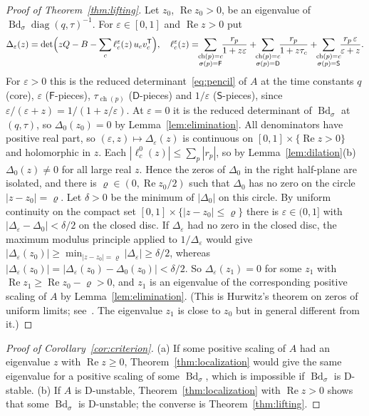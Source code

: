 \documentclass[11pt,a4paper]{article}
\theoremstyle{plain}
\theoremstyle{definition}
\theoremstyle{remark}
\newcommand{\Real}{\operatorname{Re}}
\newcommand{\diag}{\operatorname{diag}}
\newcommand{\Bd}{\operatorname{Bd}}
\newcommand{\ch}{\operatorname{ch}}
\newcommand{\rF}{\mathsf{F}}
\newcommand{\rS}{\mathsf{S}}
\newcommand{\rD}{\mathsf{D}}
\newcommand{\T}{\mathsf{T}}
\begin{document}
\begin{proof}[Proof of Theorem~\ref{thm:lifting}]
Let $z_0$, $\Real z_0>0$, be an eigenvalue of $\Bd_\sigma\diag(q,\tau)^{-1}$. For
$\varepsilon\in[0,1]$ and $\Real z>0$ put
\[
  \Delta_\varepsilon(z)=\det\Bigl(zQ-B-\sum_c\ell^\varepsilon_c(z)\,u_cv_c^\T\Bigr),\quad
  \ell^\varepsilon_c(z)=\!\!\sum_{\substack{\ch(p)=c\\ \sigma(p)=\rF}}\!\!\frac{r_p}{1+z\varepsilon}
  +\!\!\sum_{\substack{\ch(p)=c\\ \sigma(p)=\rD}}\!\!\frac{r_p}{1+z\tau_c}
  +\!\!\sum_{\substack{\ch(p)=c\\ \sigma(p)=\rS}}\!\!\frac{r_p\,\varepsilon}{\varepsilon+z}.
\]
For $\varepsilon>0$ this is the reduced determinant~\eqref{eq:pencil} of $A$ at the time
constants $q$ (core), $\varepsilon$ ($\rF$-pieces), $\tau_{\ch(p)}$ ($\rD$-pieces) and
$1/\varepsilon$ ($\rS$-pieces), since $\varepsilon/(\varepsilon+z)=1/(1+z/\varepsilon)$. At
$\varepsilon=0$ it is the reduced determinant of $\Bd_\sigma$ at $(q,\tau)$, so
$\Delta_0(z_0)=0$ by Lemma~\ref{lem:elimination}. All denominators have positive real part,
so $(\varepsilon,z)\mapsto\Delta_\varepsilon(z)$ is continuous on
$[0,1]\times\{\Real z>0\}$ and holomorphic in $z$. Each $|\ell^0_c(z)|\le\sum_p|r_p|$, so by
Lemma~\ref{lem:dilation}(b) $\Delta_0(z)\ne0$ for all large real $z$. Hence the zeros of
$\Delta_0$ in the right half-plane are isolated, and there is $\varrho\in(0,\Real z_0/2)$ such
that $\Delta_0$ has no zero on the circle $|z-z_0|=\varrho$. Let $\delta>0$ be the minimum
of $|\Delta_0|$ on this circle. By uniform continuity on the compact set
$[0,1]\times\{|z-z_0|\le\varrho\}$ there is $\varepsilon\in(0,1]$ with
$|\Delta_\varepsilon-\Delta_0|<\delta/2$ on the closed disc. If $\Delta_\varepsilon$ had no
zero in the closed disc, the maximum modulus principle applied to $1/\Delta_\varepsilon$ would
give $|\Delta_\varepsilon(z_0)|\ge\min_{|z-z_0|=\varrho}|\Delta_\varepsilon|\ge\delta/2$,
whereas $|\Delta_\varepsilon(z_0)|=|\Delta_\varepsilon(z_0)-\Delta_0(z_0)|<\delta/2$. So
$\Delta_\varepsilon(z_1)=0$ for some $z_1$ with $\Real z_1\ge\Real z_0-\varrho>0$, and $z_1$ is
an eigenvalue of the corresponding positive scaling of $A$ by Lemma~\ref{lem:elimination}.
(This is Hurwitz's theorem on zeros of uniform limits; see~\cite[Chapter~VII]{conway1978}.
The eigenvalue $z_1$ is close to $z_0$ but in general different from it.)
\end{proof}

\begin{proof}[Proof of Corollary~\ref{cor:criterion}]
(a) If some positive scaling of $A$ had an eigenvalue $z$ with $\Real z\ge0$,
Theorem~\ref{thm:localization} would give the same eigenvalue for a positive scaling of
some $\Bd_\sigma$, which is impossible if $\Bd_\sigma$ is D-stable. (b) If $A$ is
D-unstable, Theorem~\ref{thm:localization} with $\Real z>0$ shows that some $\Bd_\sigma$ is
D-unstable; the converse is Theorem~\ref{thm:lifting}.
\end{proof}
\end{document}
